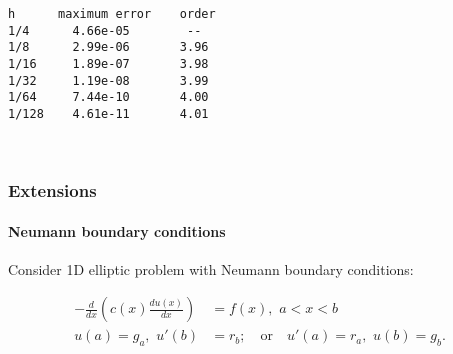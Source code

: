 \documentclass[11pt]{article}
\begin{document}
    \begin{Verbatim}[commandchars=\\\{\}]
h      maximum error    order
1/4      4.66e-05        --
1/8      2.99e-06       3.96
1/16     1.89e-07       3.98
1/32     1.19e-08       3.99
1/64     7.44e-10       4.00
1/128    4.61e-11       4.01

    \end{Verbatim}

    \begin{center}
    \end{center}
    { \hspace*{\fill} \\}
    
    \subsubsection{Extensions}\label{extensions}

\paragraph{Neumann boundary
conditions}\label{neumann-boundary-conditions}

Consider 1D elliptic problem with Neumann boundary conditions:

\begin{align}
   -\frac{d}{dx}\left(c(x)\frac{d u(x)}{dx}\right) & = f(x),\,\, a < x < b \\
   u(a) = g_a,\,\,u'(b) & = r_b;\quad\text{or}\quad u'(a) = r_a,\,\,u(b) = g_b.
\end{align}
\end{document}
